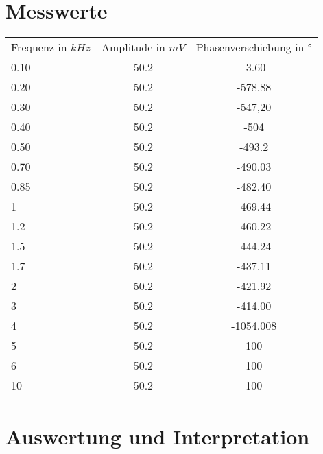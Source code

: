 \section{Messwerte}
\begin{tabular}{lcc}
  Frequenz in $kHz$ & Amplitude in $mV$ &  Phasenverschiebung in $°$ \\
  0.10 & 50.2 & -3.60 \\
  0.20 & 50.2 & -578.88 \\
  0.30 & 50.2 & -547,20 \\
  0.40 & 50.2 & -504 \\
  0.50 & 50.2 & -493.2 \\
  0.70 & 50.2 & -490.03 \\
  0.85 & 50.2 & -482.40 \\
  1 & 50.2 & -469.44 \\
  1.2 & 50.2 & -460.22 \\
  1.5 & 50.2 & -444.24 \\
  1.7 & 50.2 & -437.11 \\
  2 & 50.2 & -421.92 \\
  3 & 50.2 & -414.00 \\
  4 & 50.2 & -1054.008 \\
  5 & 50.2 & 100 \\
  6 & 50.2 & 100 \\
  10 & 50.2 & 100 \\
 \end{tabular}
\label{chap:VERSUCH_2_MESSWERTE}

\section{Auswertung und Interpretation}
